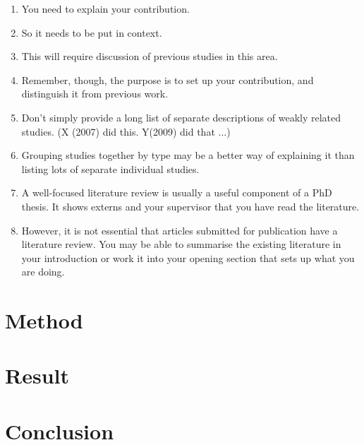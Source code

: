 \begin{enumerate}
	\item You need to explain your contribution.
	\item So it needs to be put in context.
	\item This will require discussion of previous studies in this area.
	\item Remember, though, the purpose is to set up your contribution, and distinguish it from previous work.
	\item Don’t simply provide a long list of separate descriptions of weakly related studies. (X (2007) did this. Y(2009) did that ...)
	\item Grouping studies together by type may be a better way of explaining it than listing lots of separate individual studies.
	\item A well-focused literature review is usually a useful component of a PhD thesis. It shows externs and your supervisor that you have read the literature.
	\item However, it is not essential that articles submitted for publication have a literature review. You may be able to summarise the existing literature in your introduction or work it into your opening section that sets up what you are doing.
\end{enumerate}

\section{Method}


\section{Result}



\section{Conclusion}
